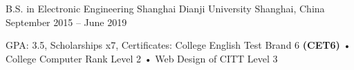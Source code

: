 

\begin{cventries}

  \cventry
    { B.S. in Electronic Engineering} %
    { Shanghai Dianji University} %
    {Shanghai, China} %
    {September 2015 -- June 2019} %
    {
      \begin{cvitems} %
        \item {GPA: 3.5, Scholarships x7, Certificates: College English Test Brand 6 \textbf{(CET6)} • College Computer Rank Level 2 • Web Design of CITT Level 3}
      \end{cvitems}
    }

\end{cventries}
